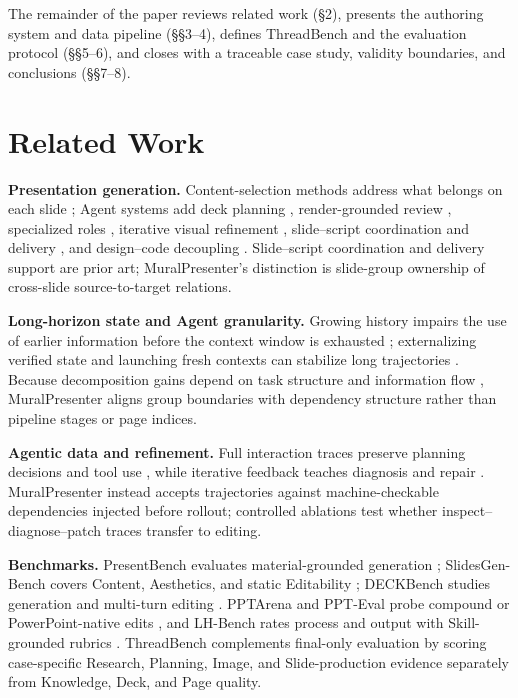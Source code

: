 The remainder of the paper reviews related work (§2), presents the authoring system and data pipeline (§§3–4), defines ThreadBench and the evaluation protocol (§§5–6), and closes with a traceable case study, validity boundaries, and conclusions (§§7–8).

\section{Related Work}

\textbf{Presentation generation.} Content-selection methods address what belongs on each slide \citep{bandyopadhyay-etal-2024-enhancing-presentation,maheshwari-etal-2024-presentations}; Agent systems add deck planning \citep{zheng2025pptagent}, render-grounded review \citep{xu-etal-2025-pregenie}, specialized roles \citep{xie2026slidebot}, iterative visual refinement \citep{zheng2026deeppresenter}, slide–script coordination and delivery \citep{yang2026deepslide}, and design–code decoupling \citep{cui2026designfirst}. Slide–script coordination and delivery support are prior art; MuralPresenter's distinction is slide-group ownership of cross-slide source-to-target relations.

\textbf{Long-horizon state and Agent granularity.} Growing history impairs the use of earlier information before the context window is exhausted \citep{sun2025contextfolding}; externalizing verified state and launching fresh contexts can stabilize long trajectories \citep{ma2026longhorizonharness}. Because decomposition gains depend on task structure and information flow \citep{kim2025scalingagents}, MuralPresenter aligns group boundaries with dependency structure rather than pipeline stages or page indices.

\textbf{Agentic data and refinement.} Full interaction traces preserve planning decisions and tool use \citep{zeng2023agenttuning,chen2024agentflan}, while iterative feedback teaches diagnosis and repair \citep{madaan2023selfrefine}. MuralPresenter instead accepts trajectories against machine-checkable dependencies injected before rollout; controlled ablations test whether inspect–diagnose–patch traces transfer to editing.

\textbf{Benchmarks.} PresentBench evaluates material-grounded generation \citep{chen2026presentbench}; SlidesGen-Bench covers Content, Aesthetics, and static Editability \citep{yang2026slidesgenbench}; DECKBench studies generation and multi-turn editing \citep{jang2026deckbench}. PPTArena and PPT-Eval probe compound or PowerPoint-native edits \citep{ofengenden2025pptarena,gandhi2026ppteval}, and LH-Bench rates process and output with Skill-grounded rubrics \citep{gupta2026lhbench}. ThreadBench complements final-only evaluation by scoring case-specific Research, Planning, Image, and Slide-production evidence separately from Knowledge, Deck, and Page quality.
